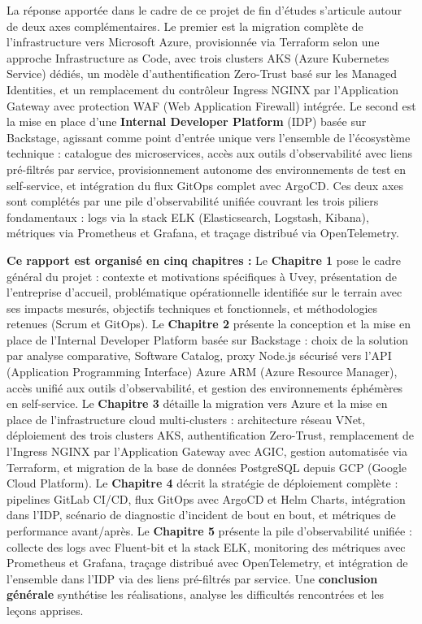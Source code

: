 \vspace{0.4cm}

\noindent La réponse apportée dans le cadre de ce projet de fin d'études s'articule autour de deux axes complémentaires. Le premier est la migration complète de l'infrastructure vers Microsoft Azure, provisionnée via Terraform selon une approche Infrastructure as Code, avec trois clusters AKS (Azure Kubernetes Service) dédiés, un modèle d'authentification Zero-Trust basé sur les Managed Identities, et un remplacement du contrôleur Ingress NGINX par l'Application Gateway avec protection WAF (Web Application Firewall) intégrée. Le second est la mise en place d'une \textbf{Internal Developer Platform} (IDP) basée sur Backstage, agissant comme point d'entrée unique vers l'ensemble de l'écosystème technique : catalogue des microservices, accès aux outils d'observabilité avec liens pré-filtrés par service, provisionnement autonome des environnements de test en self-service, et intégration du flux GitOps complet avec ArgoCD. Ces deux axes sont complétés par une pile d'observabilité unifiée couvrant les trois piliers fondamentaux : logs via la stack ELK (Elasticsearch, Logstash, Kibana), métriques via Prometheus et Grafana, et traçage distribué via OpenTelemetry.

\vspace{0.5cm}

\noindent \textbf{Ce rapport est organisé en cinq chapitres :}
Le \textbf{Chapitre 1} pose le cadre général du projet : contexte et motivations spécifiques à Uvey, présentation de l'entreprise d'accueil, problématique opérationnelle identifiée sur le terrain avec ses impacts mesurés, objectifs techniques et fonctionnels, et méthodologies retenues (Scrum et GitOps).
Le \textbf{Chapitre 2} présente la conception et la mise en place de l'Internal Developer Platform basée sur Backstage : choix de la solution par analyse comparative, Software Catalog, proxy Node.js sécurisé vers l'API (Application Programming Interface) Azure ARM (Azure Resource Manager), accès unifié aux outils d'observabilité, et gestion des environnements éphémères en self-service.
Le \textbf{Chapitre 3} détaille la migration vers Azure et la mise en place de l'infrastructure cloud multi-clusters : architecture réseau VNet, déploiement des trois clusters AKS, authentification Zero-Trust, remplacement de l'Ingress NGINX par l'Application Gateway avec AGIC, gestion automatisée via Terraform, et migration de la base de données PostgreSQL depuis GCP (Google Cloud Platform).
Le \textbf{Chapitre 4} décrit la stratégie de déploiement complète : pipelines GitLab CI/CD, flux GitOps avec ArgoCD et Helm Charts, intégration dans l'IDP, scénario de diagnostic d'incident de bout en bout, et métriques de performance avant/après.
Le \textbf{Chapitre 5} présente la pile d'observabilité unifiée : collecte des logs avec Fluent-bit et la stack ELK, monitoring des métriques avec Prometheus et Grafana, traçage distribué avec OpenTelemetry, et intégration de l'ensemble dans l'IDP via des liens pré-filtrés par service.
Une \textbf{conclusion générale} synthétise les réalisations, analyse les difficultés rencontrées et les leçons apprises.
